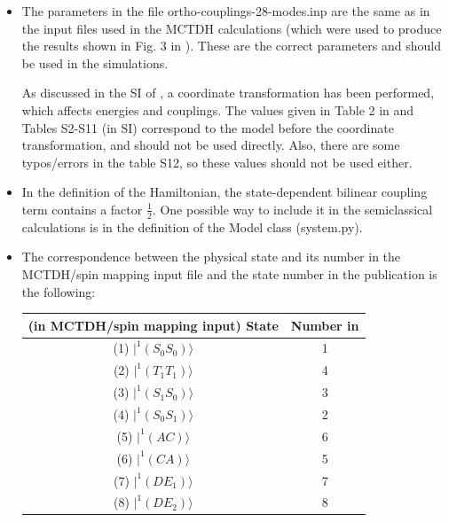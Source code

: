\documentclass{article}
\begin{document}
\begin{itemize}
	\item The parameters in the file ortho-couplings-28-modes.inp are the same as in the input files used in the MCTDH calculations (which were used to produce the results shown in Fig. 3 in \cite{reddy2018intramolecular}). These are the correct parameters and should be used in the simulations.
	
	As discussed in the SI of \cite{reddy2018intramolecular}, a coordinate transformation has been performed, which affects energies and couplings. The values given in Table 2 in \cite{reddy2018intramolecular} and Tables S2-S11 (in SI) correspond to the model before the coordinate transformation, and should not be used directly. Also, there are some typos/errors in the table S12, so these values should not be used either.
	\item In the definition of the Hamiltonian, the state-dependent bilinear coupling term contains a factor $\frac{1}{2}$. One possible way to include it in the semiclassical calculations is in the definition of the Model class (system.py). 
	\item The correspondence between the physical state and its number in the MCTDH/spin mapping input file and the state number in the publication is the following:   
	\begin{table}[!h]
		\centering
	\begin{tabular}{cc}
		\toprule
		(in MCTDH/spin mapping input) State & Number in \cite{reddy2018intramolecular}  \\ \midrule
		(1) $\vert ^1(S_0 S_0)\rangle$  & 1  \\
		(2) $\vert ^1(T_1 T_1)\rangle$ &  4  \\
		(3) $\vert ^1(S_1 S_0)\rangle$ & 3 \\
		(4) $\vert ^1(S_0 S_1)\rangle$ & 2 \\
		(5) $\vert ^1(AC)\rangle$ &  6 \\
		(6) $\vert ^1(CA)\rangle$ & 5 \\
		(7) $\vert ^1(DE_1)\rangle$ &  7  \\
		(8) $\vert ^1(DE_2)\rangle$ & 8  \\ \bottomrule
	\end{tabular}
	\end{table}
\end{itemize}
\clearpage
\end{document}
